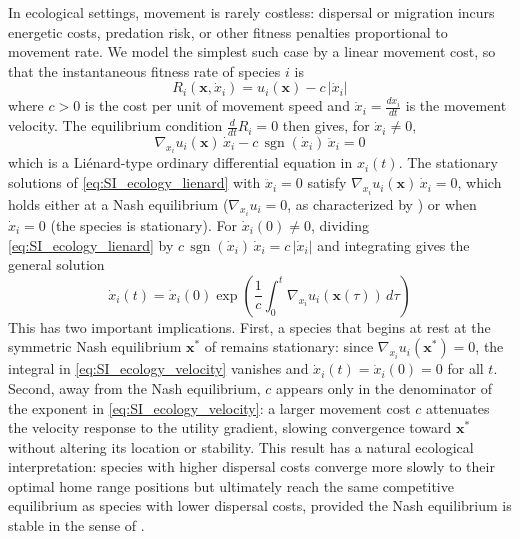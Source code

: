 \documentclass{article}
\begin{document}
            In ecological settings, movement is rarely costless: dispersal or migration incurs energetic costs, predation risk, or other fitness penalties proportional to movement rate.
            We model the simplest such case by a linear movement cost, so that the instantaneous fitness rate of species $i$ is
            \begin{equation}
                \label{eq:SI_ecology_fitness}
                R_i(\mathbf{x}, \dot{x}_i) = u_i(\mathbf{x}) - c\,|\dot{x}_i|
            \end{equation}
            where $c > 0$ is the cost per unit of movement speed and $\dot{x}_i = \frac{dx_i}{dt}$ is the movement velocity.
            The equilibrium condition $\frac{d}{dt}R_i = 0$ then gives, for $\dot{x}_i \neq 0$,
            \begin{equation}
                \label{eq:SI_ecology_lienard}
                \nabla_{x_i} u_i(\mathbf{x})\,\dot{x}_i - c\,\operatorname{sgn}(\dot{x}_i)\,\ddot{x}_i = 0
            \end{equation}
            which is a Li\'{e}nard-type ordinary differential equation in $x_i(t)$.
            The stationary solutions of \cref{eq:SI_ecology_lienard} with $\ddot{x}_i = 0$ satisfy $\nabla_{x_i} u_i(\mathbf{x})\,\dot{x}_i = 0$, which holds either at a Nash equilibrium ($\nabla_{x_i} u_i = 0$, as characterized by ) or when $\dot{x}_i = 0$ (the species is stationary).
            For $\dot{x}_i(0) \neq 0$, dividing \cref{eq:SI_ecology_lienard} by $c\,\operatorname{sgn}(\dot{x}_i)\,\dot{x}_i = c\,|\dot{x}_i|$ and integrating gives the general solution
            \begin{equation}
                \label{eq:SI_ecology_velocity}
                \dot{x}_i(t) = \dot{x}_i(0)\exp\!\left(\frac{1}{c}\int_0^t \nabla_{x_i} u_i(\mathbf{x}(\tau))\,d\tau\right)
            \end{equation}
            This has two important implications.
            First, a species that begins at rest at the symmetric Nash equilibrium $\mathbf{x}^*$ of  remains stationary: since $\nabla_{x_i} u_i(\mathbf{x}^*) = 0$, the integral in \cref{eq:SI_ecology_velocity} vanishes and $\dot{x}_i(t) = \dot{x}_i(0) = 0$ for all $t$.
            Second, away from the Nash equilibrium, $c$ appears only in the denominator of the exponent in \cref{eq:SI_ecology_velocity}: a larger movement cost $c$ attenuates the velocity response to the utility gradient, slowing convergence toward $\mathbf{x}^*$ without altering its location or stability.
            This result has a natural ecological interpretation: species with higher dispersal costs converge more slowly to their optimal home range positions but ultimately reach the same competitive equilibrium as species with lower dispersal costs, provided the Nash equilibrium is stable in the sense of .
\end{document}
